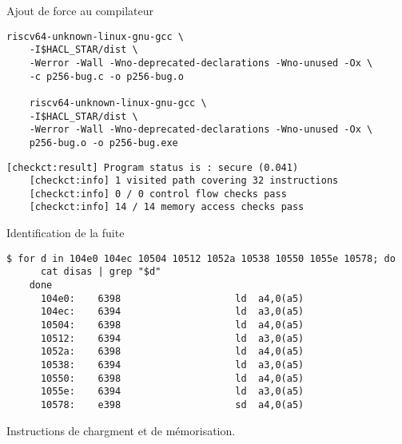 \documentclass[A4,svgnames,9pt,aspectratio=169]{beamer}
\begin{document}

\begin{frame}[fragile]{Ajout de force au compilateur}
  
  \begin{lstlisting}[style=global2, caption={Commande de compilation avec force}, gobble=4]
    riscv64-unknown-linux-gnu-gcc \
    -I$HACL_STAR/dist \
    -Werror -Wall -Wno-deprecated-declarations -Wno-unused -Ox \
    -c p256-bug.c -o p256-bug.o

    riscv64-unknown-linux-gnu-gcc \
    -I$HACL_STAR/dist \
    -Werror -Wall -Wno-deprecated-declarations -Wno-unused -Ox \
    p256-bug.o -o p256-bug.exe
  \end{lstlisting}
  
  \begin{lstlisting}[style=global, caption={Résultat significatif : options \{2,3,s,z\} }, gobble=4]
    [checkct:result] Program status is : secure (0.041)
    [checkct:info] 1 visited path covering 32 instructions
    [checkct:info] 0 / 0 control flow checks pass
    [checkct:info] 14 / 14 memory access checks pass
  \end{lstlisting}

\end{frame}


\begin{frame}[fragile]{Identification de la fuite}
  
  \begin{lstlisting}[style=global, caption={Instruction correspondantes aux fuites}, gobble=4]
    $ for d in 104e0 104ec 10504 10512 1052a 10538 10550 1055e 10578; do
      cat disas | grep "$d"
    done
      104e0:	6398                	ld	a4,0(a5)
      104ec:	6394                	ld	a3,0(a5)
      10504:	6398                	ld	a4,0(a5)
      10512:	6394                	ld	a3,0(a5)
      1052a:	6398                	ld	a4,0(a5)
      10538:	6394                	ld	a3,0(a5)
      10550:	6398                	ld	a4,0(a5)
      1055e:	6394                	ld	a3,0(a5)
      10578:	e398                	sd	a4,0(a5)
  \end{lstlisting}
  
  Instructions de chargment et de mémorisation.

\end{frame}

\end{document}
